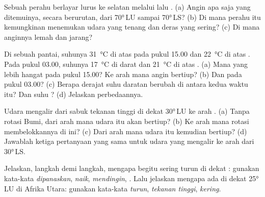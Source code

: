 \begin{exercise}[$\star\star$]\label{exo:g8:winds-global-circulation:6}
Sebuah perahu berlayar lurus ke selatan melalui  lalu
. (a) Angin apa saja yang ditemuinya, secara berurutan,
dari \ang{70}\,LU sampai \ang{70}\,LS? (b) Di mana perahu itu kemungkinan
menemukan udara yang tenang dan  deras yang sering? (c) Di mana
anginnya lemah dan  jarang?
\end{exercise}

\begin{exercise}[$\star\star$]\label{exo:g8:winds-global-circulation:7}
Di sebuah pantai, suhunya \qty{31}{\degreeCelsius} di atas  pada
pukul 15.00 dan \qty{22}{\degreeCelsius} di atas . Pada pukul 03.00,
suhunya \qty{17}{\degreeCelsius} di darat dan \qty{21}{\degreeCelsius} di
atas . (a) Mana yang lebih hangat pada pukul 15.00? Ke arah mana angin
bertiup? (b) Dan pada pukul 03.00? (c) Berapa derajat suhu daratan berubah
di antara kedua waktu itu? Dan suhu ? (d) Jelaskan perbedaannya.
\end{exercise}

\begin{exercise}[$\star\star$]\label{exo:g8:winds-global-circulation:8}
Udara mengalir dari sabuk tekanan tinggi di dekat \ang{30}\,LU ke arah
. (a) Tanpa rotasi Bumi, dari arah mana udara itu akan
bertiup? (b) Ke arah mana rotasi membelokkannya di  ini?
(c) Dari arah mana udara itu kemudian bertiup? (d) Jawablah ketiga
pertanyaan yang sama untuk udara yang mengalir ke arah  dari
\ang{30}\,LS.
\end{exercise}

\begin{exercise}[$\star\star$]\label{exo:g8:winds-global-circulation:9}
Jelaskan, langkah demi langkah, mengapa  begitu sering turun di dekat
: gunakan kata-kata \emph{dipanaskan}, \emph{naik},
\emph{mendingin}, \emph{}. Lalu jelaskan mengapa ada  di dekat
\ang{25}\,LU di Afrika Utara: gunakan kata-kata \emph{turun},
\emph{tekanan tinggi}, \emph{kering}.
\end{exercise}

